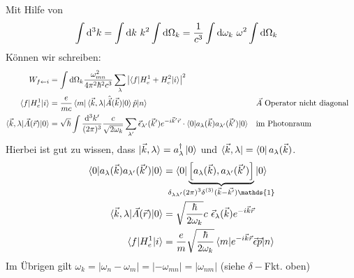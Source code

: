 	Mit Hilfe von
		\begin{align*}
			\int \mathrm{d}^3 k &= \int \mathrm{d} k ~k^2 \int \mathrm{d} \Omega_k
			= \frac{1}{c^3} \int \mathrm{d} \omega_k ~\omega^2 \int \mathrm{d} \Omega_k
		\end{align*}
	Können wir schreiben:
		\begin{align*}
			W_{f \leftarrow i} &= \int \mathrm{d} \Omega_k 
			\frac{\omega_{mn}^2}{4 \pi^2 \hbar^2 c^3}
			\sum_\lambda 
			\left|\braket{f | H_e^1 + H_e^2 | i}\right|^2 \\
			\braket{f | H_e^1 | i} &= 
			\frac{e}{mc} \braket{m | \braket{\vec{k} , \lambda | \hat{\vec{A}}(\vec{k}) | 0} \hat{p} | n} & &\vec{A}\text{~Operator nicht diagonal}\\
			\braket{\vec{k} ,\lambda | \vec{A} (\vec{r}) | 0} &= 
			\sqrt{\hbar} \int \frac{\mathrm{d}^3 k'}{(2 \pi)^3} \frac{c}{\sqrt{2 \omega_k}}
			\sum_{\lambda'} \vec{\epsilon}_{\lambda'} (\vec{k}') e^{-i \vec{k}' \vec{r}} 
			\cdot \braket{0 | a_\lambda (\vec{k}) a_{\lambda'} (\vec{k}') | 0} 
			& &\text{im Photonraum} 
		\end{align*} 
	Hierbei ist gut zu wissen, dass $\ket{\vec{k} , \lambda} = a_\lambda^\dagger \ket{0}$ und $\bra{\vec{k}, \lambda} = \bra{0}a_\lambda (\vec{k})$.
		\begin{align*}
			\braket{0 | a_\lambda (\vec{k}) a_{\lambda'} (\vec{k}') | 0} &=
			\braket{0 | 
				\underbrace{\left[ a_\lambda (\vec{k}), a_{\lambda'} (\vec{k}') \right]}_{\mathclap{\delta_{\lambda \lambda'} (2 \pi)^3 \delta^{(3)}(\vec{k} - \vec{k'}) \mathds{1}}}  
			| 0} \\
			\braket{\vec{k}, \lambda | \vec{A} (\vec{r}) | 0} &=
			\sqrt{\frac{\hbar}{2 \omega_k}} c~ \vec{\epsilon}_\lambda (\vec{k}) e^{-i \vec{k} \vec{r}} \\
			\braket{f | H_e^1 | i} &= 
			\frac{e}{m} \sqrt{\frac{\hbar}{2 \omega_k}}
			\braket{m | e^{-i \vec{k} \vec{r}} \vec{\epsilon} \vec{p} | n} 
		\end{align*}
	Im Übrigen gilt $\omega_k = |\omega_n - \omega_m| = |-\omega_{mn}| = |\omega_{nm}|$ (siehe $\delta-$Fkt. oben)
	

